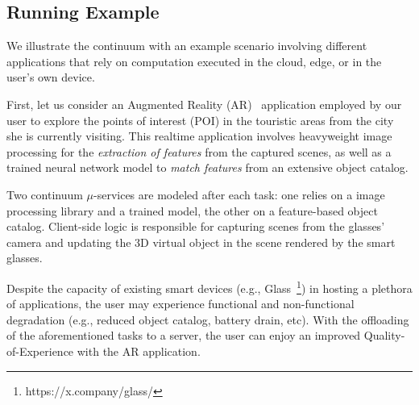 
\subsection{Running Example}
\label{sub:example}



We illustrate the continuum with an example scenario involving different applications that rely on computation executed in the cloud, edge, or in the user's own device.

First, let us consider an Augmented Reality (AR)~\cite{GarrigaMendonca2017} application employed by our user to 
explore the points of interest (POI) in the touristic areas from the city she is currently visiting.
This realtime application involves heavyweight image processing for the \textit{extraction of features} from the captured scenes, as well as a trained neural network model to \textit{match features} from an extensive object catalog.

Two continuum $\mu$-services are modeled after each task: one relies on a image processing library and a trained model, the other on a feature-based object catalog. Client-side logic is responsible for capturing scenes from the glasses' camera and updating the 3D virtual object in the scene rendered by the smart glasses.

Despite the capacity of existing smart devices (e.g., Glass~\footnote{https://x.company/glass/}) in hosting a plethora of applications, the user may experience functional and non-functional degradation (e.g., reduced object catalog, battery drain, etc). With the offloading of the aforementioned tasks to a server, the user can enjoy an improved Quality-of-Experience with the AR application.

